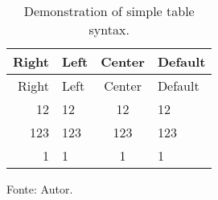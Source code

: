 \begin{longtable}[]{@{}rlcl@{}}
\caption[Demonstration of simple table syntax.\label{mytable}]{Demonstration of simple table syntax.\footnotemark{}\label{mytable}}\tabularnewline
\toprule
Right & Left & Center & Default\tabularnewline
\midrule
\endfirsthead
\toprule
Right & Left & Center & Default\tabularnewline
\midrule
\endhead
12 & 12 & 12 & 12\tabularnewline
123 & 123 & 123 & 123\tabularnewline
1 & 1 & 1 & 1\tabularnewline
\bottomrule
\end{longtable}

Fonte: Autor.
